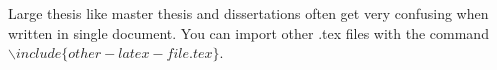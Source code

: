 \documentclass[seminararbeit,grey]{mas-thesis}				%
\begin{document}
Large thesis like master thesis and dissertations often get very confusing when written in single document. You can import other .tex files with the command $\backslash include\{other-latex-file.tex\}$.


\makelicensepageCCBYSA


% 
% 
% 
% 
% 
% 







% 







% 
\end{document}
